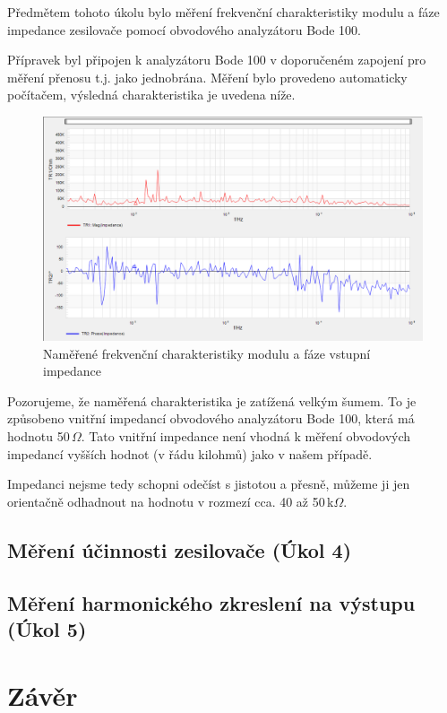 \documentclass[a4paper, czech]{article}
\begin{document}
Předmětem tohoto úkolu bylo měření frekvenční charakteristiky modulu a fáze impedance zesilovače
pomocí obvodového analyzátoru Bode 100.

Přípravek byl připojen k analyzátoru Bode 100 v doporučeném zapojení pro měření přenosu
t.j. jako jednobrána.
Měření bylo provedeno automaticky počítačem, výsledná charakteristika je uvedena níže.

\begin{figure}[H]
    \centering
    \includegraphics[width=\textwidth]{nkzt10_120324/nkzt10_3.png}
    \caption{Naměřené frekvenční charakteristiky modulu a fáze vstupní impedance}
\end{figure}

Pozorujeme, že naměřená charakteristika je zatížená velkým šumem.
To je způsobeno vnitřní impedancí obvodového analyzátoru Bode 100, která má hodnotu
50\,$\Omega$.
Tato vnitřní impedance není vhodná k měření obvodových impedancí vyšších hodnot
(v řádu kilohmů) jako v našem případě.

Impedanci nejsme tedy schopni odečíst s jistotou a přesně, můžeme ji jen orientačně odhadnout
na hodnotu v rozmezí cca. 40 až 50\,k$\Omega$.

\subsection{Měření účinnosti zesilovače (Úkol 4)}

\subsection{Měření harmonického zkreslení na výstupu (Úkol 5)}

\section{Závěr}
\end{document}
